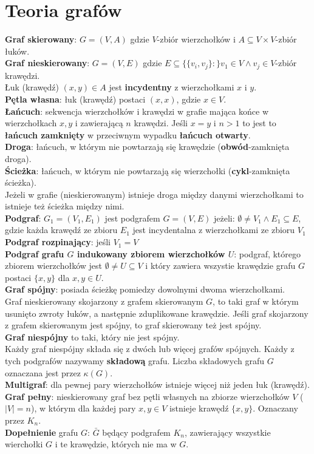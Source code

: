 \documentclass[a4paper,12pt]{article}
\begin{document}
\section{Teoria grafów}
\textbf{Graf skierowany}: $G=(V,A)$ gdzie $V$-zbiór wierzchołków i $A\subseteq V\times V$-zbiór łuków.\\
\textbf{Graf nieskierowany}: $G=(V,E)$ gdzie $E\subseteq \{\{v_i,v_j\}:\}v_1\in V \wedge v_j\in V$-zbiór krawędzi.\\
Łuk (krawędź) $(x,y)\in A$ jest \textbf{incydentny} z wierzchołkami $x$ i $y$.\\
\textbf{Pętla własna}: łuk (krawędź) postaci $(x,x)$, gdzie $x\in V$. \\
\textbf{Łańcuch}: sekwencja wierzchołków i krawędzi w grafie mająca końce w wierzchołkach $x, y$ i zawierającą $n$ krawędzi. Jeśli $x=y$ i $n>1$ to jest to \textbf{łańcuch zamknięty} w przeciwnym wypadku \textbf{łańcuch otwarty}.\\
\textbf{Droga}: łańcuch, w którym nie powtarzają się krawędzie (\textbf{obwód}-zamknięta droga).\\
\textbf{Ścieżka}: łańcuch, w którym nie powtarzają się wierzchołki (\textbf{cykl}-zamknięta ścieżka).\\
Jeżeli w grafie (nieskierowanym) istnieje droga między danymi wierzchołkami to istnieje też ścieżka między nimi.\\
\textbf{Podgraf}: $G_1=(V_1,E_1)$ jest podgrafem $G=(V,E)$ jeżeli: $\emptyset \neq V_1 \wedge E_1 \subseteq E$, gdzie każda krawędź ze zbioru $E_1$ jest incydentalna z wierzchołkami ze zbioru $V_1$\\
\textbf{Podgraf rozpinający}: jeśli $V_1=V$ \\
\textbf{Podgraf grafu $G$ indukowany zbiorem wierzchołków $U$}: podgraf, którego zbiorem wierzchołków jest $\emptyset\neq U\subseteq V$ i który zawiera wszystie krawędzie grafu $G$ postaci $\{x,y\}$ dla $x,y \in U$. \\
\textbf{Graf spójny}: posiada ścieżkę pomiedzy dowolnymi dwoma wierzchołkami.\\
Graf nieskierowany skojarzony z grafem skierowanym $G$, to taki graf w którym usunięto zwroty łuków, a następnie zduplikowane krawędzie. Jeśli graf skojarzony z grafem skierowanym jest spójny, to graf skierowany też jest spójny. \\
\textbf{Graf niespójny} to taki, który nie jest spójny.\\
Każdy graf niespójny składa się z dwóch lub więcej grafów spójnych. Każdy z tych podgrafów nazywamy \textbf{składową} grafu. Liczba składowych grafu $G$ oznaczana jest przez $\kappa(G)$. \\
\textbf{Multigraf}: dla pewnej pary wierzchołków istnieje więcej niż jeden łuk (krawędź).\\
\textbf{Graf pełny}: nieskierowany graf bez pętli własnych na zbiorze wierzchołków $V$ ($|V|=n$), w którym dla każdej pary $x,y\in V$ istnieje krawędź $\{x,y\}$. Oznaczany przez $K_n$.\\
\textbf{Dopełnienie} grafu $G$: $\bar G$ będący podgrafem $K_n$, zawierający wszystkie wierchołki $G$ i te krawędzie, których nie ma w $G$.
\end{document}
